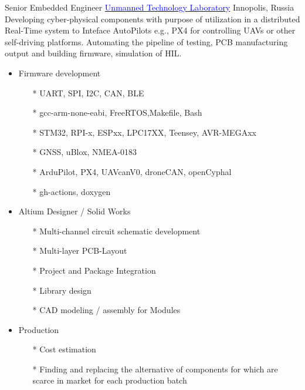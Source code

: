         {Senior Embedded Engineer}
        {\href{https://robotics.innopolis.university/en/labs/laboratoriya-bespilotnyh-technologyi/}{\textcolor{blue}{Unmanned Technology Laboratory}}}
        {Innopolis, Russia}
        {
        \newline
        Developing cyber-physical components with purpose of utilization in a distributed Real-Time system to Inteface AutoPilots e.g., PX4 for controlling UAVs or other self-driving platforms. Automating the pipeline of testing, PCB manufacturing output and building firmware, simulation of HIL.
        } 
        {
        \begin{itemize}
            \item Firmware development
            \begin{itemize}
                \item[*] UART, SPI, I2C, CAN, BLE
                \item[*] gcc-arm-none-eabi, FreeRTOS,Makefile, Bash
                \item[*] STM32, RPI-x, ESPxx, LPC17XX, Teensey, AVR-MEGAxx 
                \item[*] GNSS, uBlox, NMEA-0183
                \item[*] ArduPilot, PX4, UAVcanV0, droneCAN, openCyphal
                \item[*] gh-actions, doxygen
            \end{itemize}
            \item Altium Designer / Solid Works \begin{itemize}
                \item[*] Multi-channel circuit schematic development
                \item[*] Multi-layer PCB-Layout
                \item[*] Project and Package Integration
                \item[*] Library design
                \item[*] CAD modeling / assembly for Modules
            \end{itemize}
            \item Production 
            \begin{itemize}
            \item[*] Cost estimation 
            \item[*] Finding and replacing the alternative of components for which are scarce in market for each production batch
            \end{itemize} 
        \end{itemize}
        }

